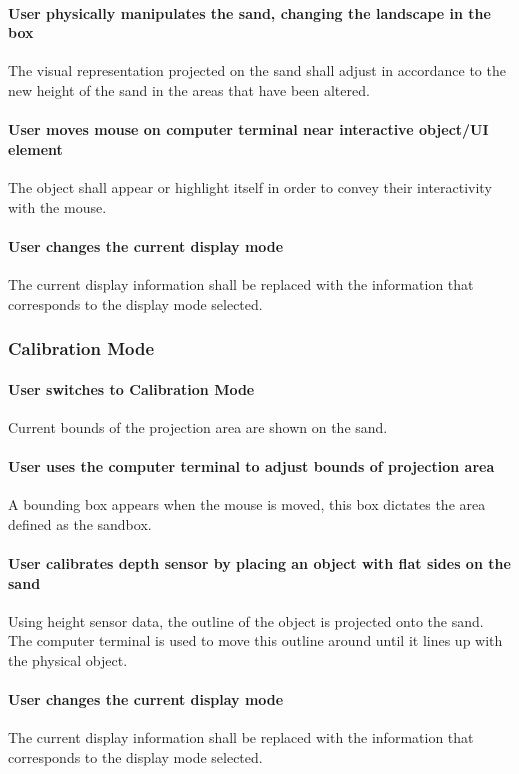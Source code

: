 \documentclass[onecolumn, draftclsnofoot,10pt, compsoc]{IEEEtran}
\begin{document}
\paragraph{User physically manipulates the sand, changing the landscape in the box}
The visual representation projected on the sand shall adjust in accordance to the new height of the sand in the areas that have been altered. 


\paragraph{User moves mouse on computer terminal near interactive object/UI element}
The object shall appear or highlight itself in order to convey their interactivity with the mouse.

\paragraph{User changes the current display mode}
The current display information shall be replaced with the information that corresponds to the display mode selected.

\subsubsection{Calibration Mode}
\paragraph{User switches to Calibration Mode}
Current bounds of the projection area are shown on the sand.


\paragraph{User uses the computer terminal to adjust bounds of projection area}
A bounding box appears when the mouse is moved, this box dictates the area defined as the sandbox.

\paragraph{User calibrates depth sensor by placing an object with flat sides on the sand}
Using height sensor data, the outline of the object is projected onto the sand. 
The computer terminal is used to move this outline around until it lines up with the physical object.

\paragraph{User changes the current display mode}
The current display information shall be replaced with the information that corresponds to the display mode selected.
\end{document}
